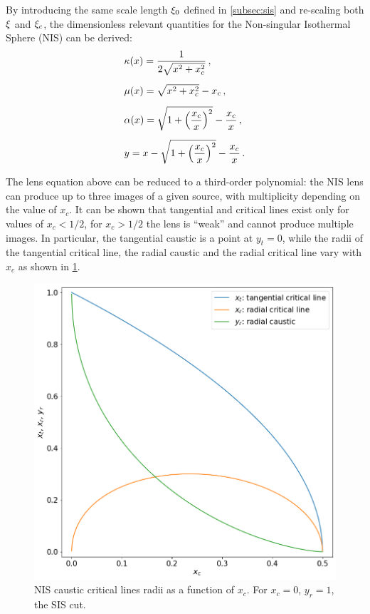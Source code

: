 By introducing the same scale length $\xi_0$ defined in \cref{subsec:sis} and re-scaling both $\xi$ and $\xi_c$, the dimensionless relevant quantities for the Non-singular Isothermal Sphere (NIS) can be derived:
\begin{equation}
\label{eq:3.32}
\begin{aligned}
    &\kappa (x) = \frac{1}{2 \sqrt{x^2 + x_c^2}} \,, \\[5pt]
    &\mu (x) = \sqrt{x^2 + x_c^2} - x_c \,, \\[5pt]
    &\alpha (x) = \sqrt{1 + \left( \frac{x_c}{x} \right)^2} - \frac{x_c}{x} \,, \\[5pt]
    &y = x - \sqrt{1 + \left( \frac{x_c}{x} \right)^2} - \frac{x_c}{x} \,.
\end{aligned}
\end{equation}

The lens equation above can be reduced to a third-order polynomial: the NIS lens can produce up to three images of a given source, with multiplicity depending on the value of $x_c$. It can be shown \citep{meneghetti_introduction_2021} that tangential and critical lines exist only for values of $x_c < 1/2$, \ie for $x_c > 1/2$ the lens is ``weak'' and cannot produce multiple images.
In particular, the tangential caustic is a point at $y_t = 0$, while the radii of the tangential critical line, the radial caustic and the radial critical line vary with $x_c$ as shown in \cref{fig:nis_radii}. 

\begin{figure}[b!]
    \centering
    \includegraphics[width=0.65\linewidth]{img//chapter3/nis_radii.png}
    \caption[NIS caustic critical lines radii as a function of $x_c$]{NIS caustic critical lines radii as a function of $x_c$. For $x_c = 0$, $y_r = 1$, \ie the SIS cut.}
    \label{fig:nis_radii}
\end{figure}


